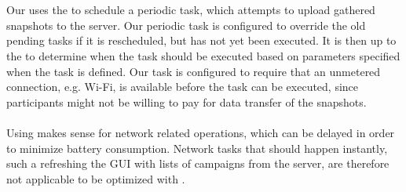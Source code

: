 \\\\
Our  uses the  to schedule a periodic task, which attempts to upload gathered snapshots to the server. Our periodic task is configured to override the old pending tasks if it is rescheduled, but has not yet been executed. It is then up to the  to determine when the task should be executed based on parameters specified when the task is defined. Our task is configured to require that an unmetered connection, e.g. Wi-Fi, is available before the task can be executed, since participants might not be willing to pay for data transfer of the snapshots. 
\\\\
Using  makes sense for network related operations, which can be delayed in order to minimize battery consumption. Network tasks that should happen instantly, such a refreshing the GUI with lists of campaigns from the server, are therefore not applicable to be optimized with . 

